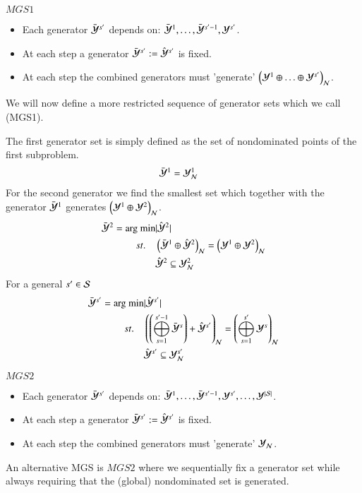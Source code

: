 \begin{enumerate}
$MGS1$
\begin{itemize}
	\item Each generator $\bY^{s'}$ depends on: $\bY^1, \hdots, \bY^{s'-1}, \Y^{s'} $.
	\item At each step a generator $\bY^{s'} := \hY^{s'}$ is fixed.
	\item At each step the combined generators must 'generate' $\left( \Y^1 \+ \hdots \+ \Y^{s'} \right)_\mcN $.
\end{itemize}
We will now define a more restricted sequence of generator sets which we call (MGS1).  


The first generator set is simply defined as the set of nondominated points of the first subproblem.
\begin{align}
    \bY^1  &= \Yn^1
\end{align}
For the second generator we find the smallest set which together with the generator $\bY^1$ generates $\left( \Y^1 \+ \Y^2 \right)_\mcN$.
\begin{align}
    \bY^2 = \text{arg min} &\lvert \hY^2 \rvert \\ 
    st. \quad& \left( \bY^1 \+ \hY^2 \right)_\mcN = \left( \Y^1 \+ \Y^2 \right)_\mcN  \nonumber  \\
	     & \hY^2 \subseteq \Yn^2\nonumber
\end{align}
For a general $s' \in \S$
\begin{align}
    \bY^{s'} = \text{arg min} &\lvert \hY^{s'} \rvert \\ 
    st. \quad& \left( \left( \msum_{s = 1}^{s'-1} \bY^s \right)  + \hY^{s'} \right)_\mcN = \left( \msum_{s=1}^{s'} \Y^s \right)_\mcN  \nonumber  \\
	     & \hY^{s'} \subseteq \Yn^{s'} \nonumber
\end{align}

$MGS2$
\begin{itemize}
	\item Each generator $\bY^{s'}$ depends on: $\bY^1, \hdots, \bY^{s'-1}, \Y^{s'}, \hdots, \Y^{\abs{\S}} $.
	\item At each step a generator $\bY^{s'} := \hY^{s'}$ is fixed.
	\item At each step the combined generators must 'generate' $\Yn $.
\end{itemize}

An alternative MGS is $MGS2$ where we sequentially fix a generator set while always requiring that the (global) nondominated set is generated.


\end{enumerate}
